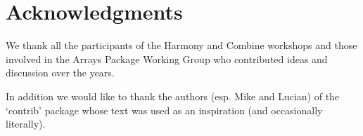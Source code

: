 
\section{Acknowledgments}

We thank all the participants of the Harmony and Combine workshops and
those involved in the Arrays Package Working Group who contributed ideas and discussion over
the years.

In addition we would like to thank the authors (esp. Mike and Lucian) of the `contrib' package whose text was used as an inspiration (and occasionally literally).
